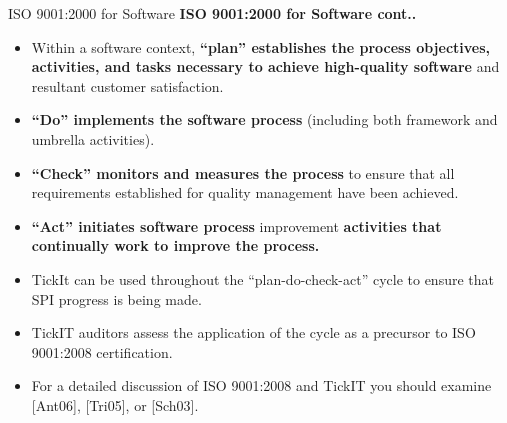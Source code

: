 \documentclass{beamer}
\begin{document}
\begin{frame}{ISO 9001:2000 for Software}
	\textbf{ISO 9001:2000 for Software cont..}
	\begin{itemize}
		\item Within a software context, \textbf{“plan” establishes the process objectives, activities, and tasks necessary to achieve high-quality software} and resultant customer satisfaction. 
		\item \textbf{“Do” implements the software process} (including both framework and umbrella activities). 
		\item \textbf{“Check” monitors and measures the process} to ensure that all requirements established for quality management have been achieved. 
		\item \textbf{“Act” initiates software process} improvement \textbf{activities that continually work to improve the process. }
		\item TickIt can be used throughout the “plan-do-check-act” cycle to ensure that SPI progress is being made. 
		\item TickIT auditors assess the application of the cycle as a precursor to ISO 9001:2008 certification. 
		\item For a detailed discussion of ISO 9001:2008 and TickIT you should examine [Ant06], [Tri05], or [Sch03].
	\end{itemize}
\end{frame}
\end{document}
